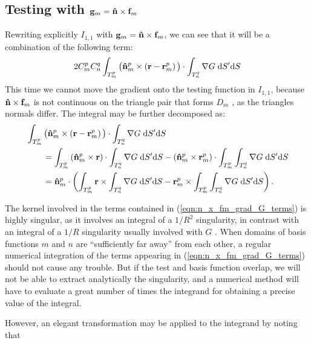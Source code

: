\subsection{Testing with $\mathbf{g}_m = \mathbf{\Hat{n}} \times \mathbf{f}_m$}
%
\par
Rewriting explicitly $I_{1,1}$ with $\mathbf{g}_m = \mathbf{\Hat{n}} \times \mathbf{f}_m$, we can see that it will be a combination of the following term:
\begin{equation}
2 C_m^p C_n^q \int_{T_m^p} \big(\mathbf{\Hat{n}}_m^p \times \left(\mathbf{r}-\mathbf{r}_m^p \right) \big) \cdot \int_{T_n^q} \nabla G \; \text{d} S' \text{d} S
\end{equation}
This time we cannot move the gradient onto the testing function in $I_{1,1}$, because $\mathbf{\Hat{n}} \times \mathbf{f}_m$ is not continuous on the triangle pair that forms $D_m$ \cite{Taskinen_03}, as the triangles normals differ. The integral may be further decomposed as:
\begin{equation} \label{eqn:n_x_fm_grad_G_terms}
\begin{split}
&\int_{T_m^p} \big(\mathbf{\Hat{n}}_m^p \times \left(\mathbf{r}-\mathbf{r}_m^p \right) \big) \cdot \int_{T_n^q} \nabla G \; \text{d} S' \text{d} S \\
&\qquad = \int_{T_m^p} \left(\mathbf{\Hat{n}}_m^p \times \mathbf{r} \right) \cdot \int_{T_n^q} \nabla G \; \text{d} S' \text{d} S - \left(\mathbf{\Hat{n}}_m^p \times \mathbf{r}_m^p\right) \cdot \int_{T_m^p} \int_{T_n^q} \nabla G \; \text{d} S' \text{d} S \\
&\qquad  = \mathbf{\Hat{n}}_m^p \cdot \left(\int_{T_m^p} \mathbf{r} \times \int_{T_n^q} \nabla G \; \text{d} S' \text{d} S - \mathbf{r}_m^p \times \int_{T_m^p} \int_{T_n^q} \nabla G \; \text{d} S' \text{d} S\right).
\end{split}
\end{equation}
%
\par
The kernel involved in the terms contained in (\ref{eqn:n_x_fm_grad_G_terms}) is highly singular, as it involves an integral of a $1/R^2$ singularity, in contrast with an integral of a $1/R$ singularity usually involved with $G$ \cite{Taskinen_03}. When domains of basis functions $m$ and $n$ are ``sufficiently far away'' from each other, a regular numerical integration of the terms appearing in (\ref{eqn:n_x_fm_grad_G_terms}) should not cause any trouble. But if the test and basis function overlap, we will not be able to extract analytically the singularity, and a numerical method will have to evaluate a great number of times the integrand for obtaining a precise value of the integral. 
%
\par
However, an elegant transformation may be applied to the integrand by noting that

